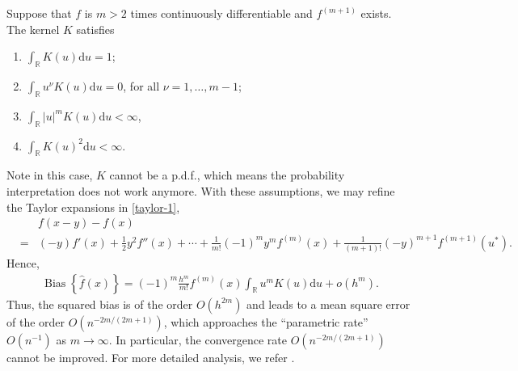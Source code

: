 \documentclass[19pt,landscape]{article}
\newcommand{\R}{\mathbb{R}}
\DeclareMathOperator{\bs}{\mathrm{Bias}}
\begin{document}
    Suppose that $f$ is $m>2$ times continuously differentiable and $f^{(m+1)}$ exists. The kernel $K$ satisfies 
    \begin{enumerate}
    \item $\int_{\R}K(u)\mathrm{d}u=1$;
    \item $\int_{\R}u^{\nu} K(u)\mathrm{d}u=0$, for all $\nu=1,\dots,m-1$;
    \item $\int_{\R}|u|^mK(u)\mathrm{d}u<\infty$,
    \item $\int_{\R}K(u)^2\mathrm{d}u<\infty$.
    \end{enumerate}
Note in this case, $K$ cannot be a p.d.f., which means the probability interpretation does not work anymore. 
\newpage
With these assumptions, we may refine the Taylor expansions in \eqref{taylor-1}, 
\begin{eqnarray*}
    &&f(x-y)-f(x)\\
    &=&(-y)f'(x)+\frac12y^2f''(x)+\cdots+\frac1{m!}(-1)^my^mf^{(m)}(x)+\frac1{(m+1)!}(-y)^{m+1}f^{(m+1)}(u^*).
\end{eqnarray*} 
Hence, 
\begin{eqnarray}
    \bs\left\{\hat{f}(x)\right\}=(-1)^m\frac{h^m}{m!}f^{(m)}(x)\int_{\R}u^mK(u)\mathrm{d}u+o(h^m).
\end{eqnarray}
\vskip 10pt
Thus, the squared bias is of the order $O(h^{2m})$ and leads to a mean square error of the order $O(n^{-2m/(2m+1)})$, which approaches the ``parametric rate'' $O(n^{-1})$ as $m\to\infty$. 
\vskip 10pt
In particular, the convergence rate $O(n^{-2m/(2m+1)})$ cannot be improved. For more detailed analysis, we refer
    \cite[Chapter~24]{Vaart98}.
\end{document}
